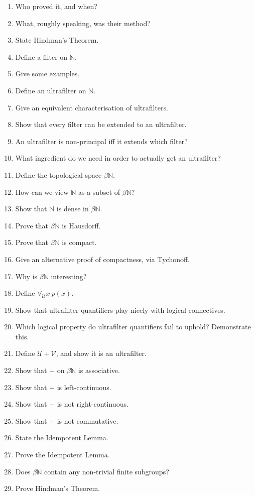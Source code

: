 \documentclass[10pt]{article}
\newcommand{\bb}[1]{\mathbb{#1}}
\newcommand{\N}{\bb{N}}
\newcommand{\U}{\mathcal{U}}
\newcommand{\V}{\mathcal{V}}
\newcommand{\fu}{\forall_\U}
\begin{document}
\begin{enumerate}
    \item Who proved it, and when?
    \item What, roughly speaking, was their method?
    \item State Hindman's Theorem.
    \item Define a filter on $\N$.
    \item Give some examples.
    \item Define an ultrafilter on $\N$.
    \item Give an equivalent characterisation of ultrafilters.
    \item Show that every filter can be extended to an ultrafilter.
    \item An ultrafilter is non-principal iff it extends which filter?
    \item What ingredient do we need in order to actually get an ultrafilter?
    \item Define the topological space $\beta\N$.
    \item How can we view $\N$ as a subset of $\beta\N$?
    \item Show that $\N$ is dense in $\beta\N$.
    \item Prove that $\beta\N$ is Hausdorff.
    \item Prove that $\beta\N$ is compact.
    \item Give an alternative proof of compactness, via Tychonoff.
    \item Why is $\beta\N$ interesting?
    \item Define $\fu x\ p(x)$.
    \item Show that ultrafilter quantifiers play nicely with logical connectives.
    \item Which logical property do ultrafilter quantifiers fail to uphold? Demonstrate this.
    \item Define $\U + \V$, and show it is an ultrafilter.
    \item Show that $+$ on $\beta\N$ is associative.
    \item Show that $+$ is left-continuous.
    \item Show that $+$ is not right-continuous.
    \item Show that $+$ is not commutative.
    \item State the Idempotent Lemma.
    \item Prove the Idempotent Lemma.
    \item Does $\beta\N$ contain any non-trivial finite subgroups?
    \item Prove Hindman's Theorem.

\end{enumerate}
\end{document}
